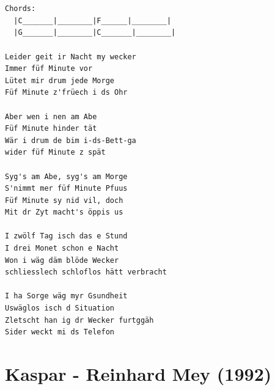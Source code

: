 \documentclass[
]{book}
\let\stdsection\section
\renewcommand\section{\clearpage\stdsection}
\begin{document}
\begin{verbatim}


Chords:
  |C_______|________|F______|________|
  |G_______|________|C_______|________|

Leider geit ir Nacht my wecker
Immer füf Minute vor
Lütet mir drum jede Morge
Füf Minute z'früech i ds Ohr

Aber wen i nen am Abe
Füf Minute hinder tät
Wär i drum de bim i-ds-Bett-ga
wider füf Minute z spät

Syg's am Abe, syg's am Morge
S'nimmt mer füf Minute Pfuus
Füf Minute sy nid vil, doch
Mit dr Zyt macht's öppis us

I zwölf Tag isch das e Stund
I drei Monet schon e Nacht
Won i wäg däm blöde Wecker
schliesslech schloflos hätt verbracht

I ha Sorge wäg myr Gsundheit
Uswäglos isch d Situation
Zletscht han ig dr Wecker furtggäh
Sider weckt mi ds Telefon
\end{verbatim}

\hypertarget{kaspar---reinhard-mey-1992}{%
\section{Kaspar - Reinhard Mey (1992)}\label{kaspar---reinhard-mey-1992}}
\end{document}
